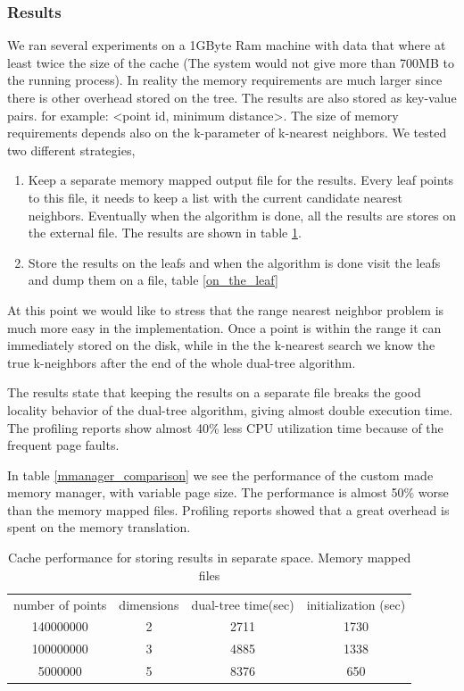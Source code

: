 \documentclass[12pt,letterpaper,doublespaced,ETD,dvips,proposal]{gtthesis}
\begin{document}
\begin{Body}
\subsubsection{Results}
We ran several experiments on a 1GByte Ram machine with data that where  at least twice the
size of the cache (The system would not give more than 700MB to the running process). 
In reality the memory requirements are much larger since there is other overhead stored on the
tree. The results are also stored as key-value pairs. for example: <point id, minimum distance>.
The size of memory requirements depends also on the k-parameter of k-nearest neighbors.
We tested two different strategies, 
\begin{enumerate}
  \item Keep a separate memory mapped output file for the 
        results. Every leaf points to this file, it needs to keep a list with the current candidate
        nearest neighbors. Eventually when the algorithm is done, all the results are stores
        on the external file. The results are shown in table \ref{on_a_separate_file}.
  \item Store the results on the leafs and when the algorithm is done visit the leafs and
        dump them on a file, table \ref{on_the_leaf}
\end{enumerate}
At this point we would like to stress that the range nearest neighbor problem is much more
easy in the implementation. Once a point is within the range it can immediately stored on the
disk, while in the the k-nearest search we know the true k-neighbors after the end of the
whole dual-tree algorithm.

The results state that keeping the results on a separate file breaks the good locality
behavior of the dual-tree algorithm, giving almost double execution time. The profiling
reports show almost 40\% less CPU utilization time because of the frequent page faults.

In table \ref{mmanager_comparison} we see the performance
of the custom made memory manager, with variable page size. The performance is almost 50\%
worse than the memory mapped files. Profiling reports showed that a great overhead is spent
on the memory translation.   

\begin{table}[!htb]
\label{on_a_separate_file}
\footnotesize{ \centering
\begin{tabular}{|c|c|c|c|}
  \hline
  number of points & dimensions & dual-tree time(sec)& initialization (sec)\\
  140000000        & 2          & 2711               & 1730\\
  100000000        & 3          & 4885               & 1338\\
  5000000          & 5          & 8376               & 650\\
  \hline
\end{tabular}
\caption{Cache performance for storing results in separate space. Memory mapped files}
}
\end{table}


\end{Body}
\end{document}
